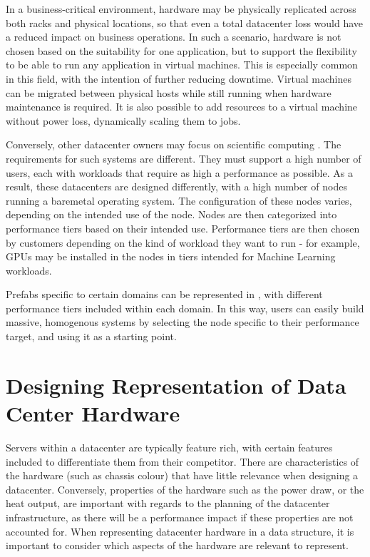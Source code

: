 \documentclass[11pt]{article}
\begin{document}
		In a business-critical environment, hardware may be physically replicated across both racks and physical locations, so that even a total datacenter loss would have a reduced impact on business operations.
		In such a scenario, hardware is not chosen based on the suitability for one application, but to support the flexibility to be able to run any application in virtual machines.
		This is especially common in this field, with the intention of further reducing downtime.
		Virtual machines can be migrated between physical hosts while still running when hardware maintenance is required.
		It is also possible to add resources to a virtual machine without power loss, dynamically scaling them to jobs.

		Conversely, other datacenter owners may focus on scientific computing \cite{SURF2020}.
		The requirements for such systems are different.
		They must support a high number of users, each with workloads that require as high a performance as possible.
		As a result, these datacenters are designed differently, with a high number of nodes running a baremetal operating system.
		The configuration of these nodes varies, depending on the intended use of the node.
		Nodes are then categorized into performance tiers based on their intended use.
		Performance tiers are then chosen by customers depending on the kind of workload they want to run - for example, GPUs may be installed in the nodes in tiers intended for Machine Learning workloads.

		Prefabs specific to certain domains can be represented in \opendc{}, with different performance tiers included within each domain.
		In this way, users can easily build massive, homogenous systems by selecting the node specific to their performance target, and using it as a starting point.

\newpage

\section{Designing Representation of Data Center Hardware} \label{sec:design}
	Servers within a datacenter are typically feature rich, with certain features included to differentiate them from their competitor.
	There are characteristics of the hardware (such as chassis colour) that have little relevance when designing a datacenter.
	Conversely, properties of the hardware such as the power draw, or the heat output, are important with regards to the planning of the datacenter infrastructure, as there will be a performance impact if these properties are not accounted for.
	When representing datacenter hardware in a data structure, it is important to consider which aspects of the hardware are relevant to represent.
	
\end{document}
